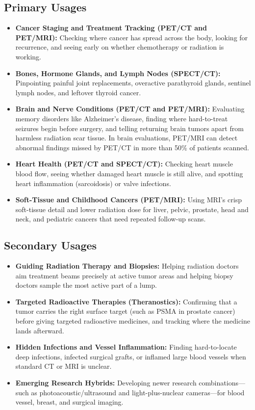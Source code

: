 \subsection{Primary Usages}
\begin{itemize}
    \item \textbf{Cancer Staging and Treatment Tracking (PET/CT and PET/MRI):} Checking where cancer has spread across the body, looking for recurrence, and seeing early on whether chemotherapy or radiation is working.
    \item \textbf{Bones, Hormone Glands, and Lymph Nodes (SPECT/CT):} Pinpointing painful joint replacements, overactive parathyroid glands, sentinel lymph nodes, and leftover thyroid cancer.
    \item \textbf{Brain and Nerve Conditions (PET/CT and PET/MRI):} Evaluating memory disorders like Alzheimer's disease, finding where hard-to-treat seizures begin before surgery, and telling returning brain tumors apart from harmless radiation scar tissue. In brain evaluations, PET/MRI can detect abnormal findings missed by PET/CT in more than 50\% of patients scanned.
    \item \textbf{Heart Health (PET/CT and SPECT/CT):} Checking heart muscle blood flow, seeing whether damaged heart muscle is still alive, and spotting heart inflammation (sarcoidosis) or valve infections.
    \item \textbf{Soft-Tissue and Childhood Cancers (PET/MRI):} Using MRI's crisp soft-tissue detail and lower radiation dose for liver, pelvic, prostate, head and neck, and pediatric cancers that need repeated follow-up scans.
\end{itemize}

\subsection{Secondary Usages}
\begin{itemize}
    \item \textbf{Guiding Radiation Therapy and Biopsies:} Helping radiation doctors aim treatment beams precisely at active tumor areas and helping biopsy doctors sample the most active part of a lump.
    \item \textbf{Targeted Radioactive Therapies (Theranostics):} Confirming that a tumor carries the right surface target (such as PSMA in prostate cancer) before giving targeted radioactive medicines, and tracking where the medicine lands afterward.
    \item \textbf{Hidden Infections and Vessel Inflammation:} Finding hard-to-locate deep infections, infected surgical grafts, or inflamed large blood vessels when standard CT or MRI is unclear.
    \item \textbf{Emerging Research Hybrids:} Developing newer research combinations---such as photoacoustic/ultrasound and light-plus-nuclear cameras---for blood vessel, breast, and surgical imaging.
\end{itemize}

